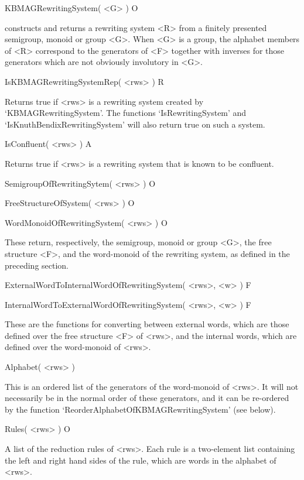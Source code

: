 \>KBMAGRewritingSystem( <G> ) O

constructs and returns a rewriting system <R> from  a
finitely presented semigroup, monoid or group <G>.
When <G> is a group, the alphabet members of <R> correspond to the generators
of  <F>  together with inverses  for  those  generators  which are not
obviously involutory in <G>.



\>IsKBMAGRewritingSystemRep( <rws> ) R

Returns true if <rws> is a rewriting system created by 
`KBMAGRewritingSystem'. The functions `IsRewritingSystem' and
`IsKnuthBendixRewritingSystem' will also return true on
such a system.

\>IsConfluent( <rws> ) A

Returns true if <rws> is a rewriting system that is known
to be confluent.

\>SemigroupOfRewritingSytem( <rws> ) O

\>FreeStructureOfSystem( <rws> ) O

\>WordMonoidOfRewritingSystem( <rws> ) O

These return, respectively, the semigroup, monoid or group <G>,
the free structure <F>, and the word-monoid of the rewriting system,
as defined in the preceding section.

\>ExternalWordToInternalWordOfRewritingSystem( <rws>, <w> ) F

\>InternalWordToExternalWordOfRewritingSystem( <rws>, <w> ) F

These are the functions for converting between external words,
which are those defined over the free structure <F> of <rws>,
and the internal words, which are defined over the word-monoid
of <rws>.

\>Alphabet( <rws> )

This is an ordered list of the generators of the word-monoid of <rws>.
It will not necessarily be in the normal order of these generators,
and it can be re-ordered by the function
`ReorderAlphabetOfKBMAGRewritingSystem' (see below).

\>Rules( <rws> ) O

A list of the reduction rules of <rws>. Each rule is a two-element list
containing the left and right hand sides of the rule, which are words
in the alphabet of <rws>.

